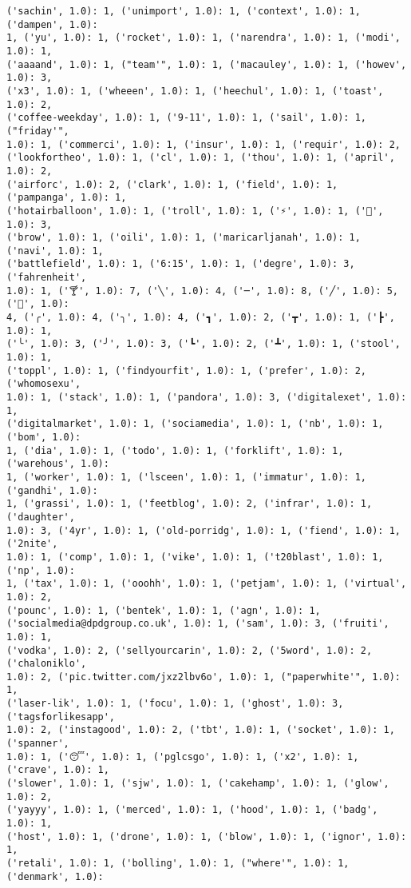\documentclass[11pt]{article}
\begin{document}
\begin{Verbatim}[commandchars=\\\{\}]
('sachin', 1.0): 1, ('unimport', 1.0): 1, ('context', 1.0): 1, ('dampen', 1.0):
1, ('yu', 1.0): 1, ('rocket', 1.0): 1, ('narendra', 1.0): 1, ('modi', 1.0): 1,
('aaaand', 1.0): 1, ("team'", 1.0): 1, ('macauley', 1.0): 1, ('howev', 1.0): 3,
('x3', 1.0): 1, ('wheeen', 1.0): 1, ('heechul', 1.0): 1, ('toast', 1.0): 2,
('coffee-weekday', 1.0): 1, ('9-11', 1.0): 1, ('sail', 1.0): 1, ("friday'",
1.0): 1, ('commerci', 1.0): 1, ('insur', 1.0): 1, ('requir', 1.0): 2,
('lookfortheo', 1.0): 1, ('cl', 1.0): 1, ('thou', 1.0): 1, ('april', 1.0): 2,
('airforc', 1.0): 2, ('clark', 1.0): 1, ('field', 1.0): 1, ('pampanga', 1.0): 1,
('hotairballoon', 1.0): 1, ('troll', 1.0): 1, ('⚡', 1.0): 1, ('👏', 1.0): 3,
('brow', 1.0): 1, ('oili', 1.0): 1, ('maricarljanah', 1.0): 1, ('navi', 1.0): 1,
('battlefield', 1.0): 1, ('6:15', 1.0): 1, ('degre', 1.0): 3, ('fahrenheit',
1.0): 1, ('🍸', 1.0): 7, ('╲', 1.0): 4, ('─', 1.0): 8, ('╱', 1.0): 5, ('🍤', 1.0):
4, ('╭', 1.0): 4, ('╮', 1.0): 4, ('┓', 1.0): 2, ('┳', 1.0): 1, ('┣', 1.0): 1,
('╰', 1.0): 3, ('╯', 1.0): 3, ('┗', 1.0): 2, ('┻', 1.0): 1, ('stool', 1.0): 1,
('toppl', 1.0): 1, ('findyourfit', 1.0): 1, ('prefer', 1.0): 2, ('whomosexu',
1.0): 1, ('stack', 1.0): 1, ('pandora', 1.0): 3, ('digitalexet', 1.0): 1,
('digitalmarket', 1.0): 1, ('sociamedia', 1.0): 1, ('nb', 1.0): 1, ('bom', 1.0):
1, ('dia', 1.0): 1, ('todo', 1.0): 1, ('forklift', 1.0): 1, ('warehous', 1.0):
1, ('worker', 1.0): 1, ('lsceen', 1.0): 1, ('immatur', 1.0): 1, ('gandhi', 1.0):
1, ('grassi', 1.0): 1, ('feetblog', 1.0): 2, ('infrar', 1.0): 1, ('daughter',
1.0): 3, ('4yr', 1.0): 1, ('old-porridg', 1.0): 1, ('fiend', 1.0): 1, ('2nite',
1.0): 1, ('comp', 1.0): 1, ('vike', 1.0): 1, ('t20blast', 1.0): 1, ('np', 1.0):
1, ('tax', 1.0): 1, ('ooohh', 1.0): 1, ('petjam', 1.0): 1, ('virtual', 1.0): 2,
('pounc', 1.0): 1, ('bentek', 1.0): 1, ('agn', 1.0): 1,
('socialmedia@dpdgroup.co.uk', 1.0): 1, ('sam', 1.0): 3, ('fruiti', 1.0): 1,
('vodka', 1.0): 2, ('sellyourcarin', 1.0): 2, ('5word', 1.0): 2, ('chaloniklo',
1.0): 2, ('pic.twitter.com/jxz2lbv6o', 1.0): 1, ("paperwhite'", 1.0): 1,
('laser-lik', 1.0): 1, ('focu', 1.0): 1, ('ghost', 1.0): 3, ('tagsforlikesapp',
1.0): 2, ('instagood', 1.0): 2, ('tbt', 1.0): 1, ('socket', 1.0): 1, ('spanner',
1.0): 1, ('😴', 1.0): 1, ('pglcsgo', 1.0): 1, ('x2', 1.0): 1, ('crave', 1.0): 1,
('slower', 1.0): 1, ('sjw', 1.0): 1, ('cakehamp', 1.0): 1, ('glow', 1.0): 2,
('yayyy', 1.0): 1, ('merced', 1.0): 1, ('hood', 1.0): 1, ('badg', 1.0): 1,
('host', 1.0): 1, ('drone', 1.0): 1, ('blow', 1.0): 1, ('ignor', 1.0): 1,
('retali', 1.0): 1, ('bolling', 1.0): 1, ("where'", 1.0): 1, ('denmark', 1.0):

\end{Verbatim}
\end{document}
